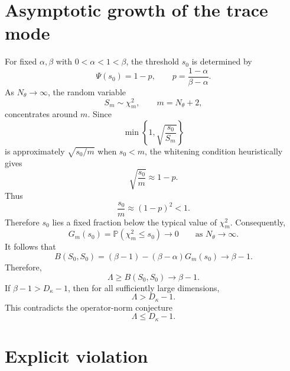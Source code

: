 \documentclass[11pt]{article}
\numberwithin{equation}{section}
\begin{document}
\section{Asymptotic growth of the trace mode}

For fixed $\alpha,\beta$ with $0<\alpha<1<\beta$, the threshold $s_0$ is determined by
\begin{equation}
    \Psi(s_0)=1-p,
    \qquad
    p=\frac{1-\alpha}{\beta-\alpha}.
\end{equation}
As $N_\theta\to\infty$, the random variable
\begin{equation}
    S_m\sim \chi_m^2,
    \qquad
    m=N_\theta+2,
\end{equation}
concentrates around $m$. 
Since
\begin{equation}
    \min\left\{1,\sqrt{\frac{s_0}{S_m}}\right\}
\end{equation}
is approximately $\sqrt{s_0/m}$ when $s_0<m$, the whitening condition heuristically gives
\begin{equation}
    \sqrt{\frac{s_0}{m}}
    \approx
    1-p.
\end{equation}
Thus
\begin{equation}
    \frac{s_0}{m}
    \approx
    (1-p)^2
    <
    1.
\end{equation}
Therefore $s_0$ lies a fixed fraction below the typical value of $\chi_m^2$. 
Consequently,
\begin{equation}
    G_m(s_0)
    =
    \mathbb P(\chi_m^2\le s_0)
    \to 0
    \qquad
    \text{as }
    N_\theta\to\infty.
\end{equation}
It follows that
\begin{equation}
    B(S_0,S_0)
    =
    (\beta-1)
    -
    (\beta-\alpha)G_m(s_0)
    \to
    \beta-1.
\end{equation}
Therefore,
\begin{equation}
    \Lambda
    \ge
    B(S_0,S_0)
    \to
    \beta-1.
\end{equation}
If $\beta-1>D_\kappa-1$, then for all sufficiently large dimensions,
\begin{equation}
    \Lambda>D_\kappa-1.
\end{equation}
This contradicts the operator-norm conjecture
\begin{equation}
    \Lambda\le D_\kappa-1.
\end{equation}

\section{Explicit violation}
\end{document}
